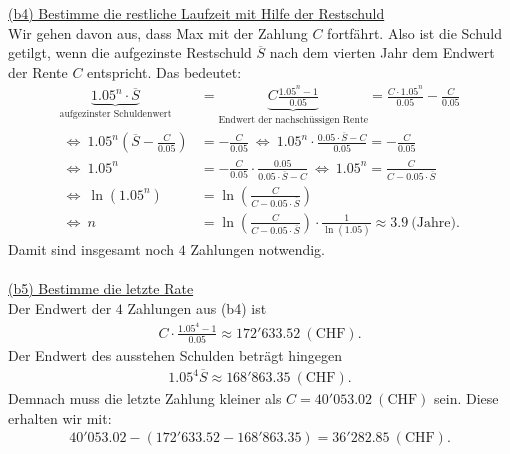 \underline{(b4) Bestimme die restliche Laufzeit mit Hilfe der Restschuld}\\
Wir gehen davon aus, dass Max mit der Zahlung $ C $ fortfährt.
Also ist die Schuld getilgt, wenn die aufgezinste Restschuld $ \overline{S} $ nach dem vierten Jahr dem Endwert der Rente $ C $ entspricht. Das bedeutet:
\begin{align*}
	\underbrace{1.05^n \cdot \overline{S}}_{\textrm{aufgezinster Schuldenwert}}
	&=
	\underbrace{C\frac{1.05^n -1}{0.05}}_{\textrm{Endwert der nachschüssigen Rente}}
	=
	\frac{C \cdot 1.05^n}{0.05} - \frac{C}{0.05}\\
	\ \Leftrightarrow \
	1.05^n \left(\overline{S} - \frac{C}{0.05}\right) &= - \frac{C}{0.05}
	\ \Leftrightarrow \
	1.05^n \cdot \frac{0.05 \cdot \overline{S} -C}{0.05}  = -\frac{C}{0.05}\\
	\ \Leftrightarrow \
	1.05^n &= -\frac{C}{0.05} \cdot \frac{0.05}{0.05 \cdot \overline{S} -C}
	 \  \Leftrightarrow \
	1.05^n =  \frac{C}{C - 0.05 \cdot \overline{S}}\\
	\ \Leftrightarrow \
	\ln(1.05^n) &= \ln\left(\frac{C}{C - 0.05 \cdot \overline{S}}\right)\\
	\ \Leftrightarrow \
	n &= \ln\left(\frac{C}{C - 0.05 \cdot \overline{S}}\right)\cdot \frac{1}{\ln(1.05)}
	\approx 3.9 \ \textrm{(Jahre)}.
\end{align*}
Damit sind insgesamt noch $ 4 $ Zahlungen notwendig.\\
\\
\underline{(b5) Bestimme die letzte Rate}\\
Der Endwert der $ 4 $ Zahlungen aus (b4) ist
\begin{align*}
	C \cdot \frac{1.05^4 -1 }{0.05}
	\approx 172'633.52 \ \mathrm{(CHF)}.
\end{align*}
Der Endwert des ausstehen Schulden beträgt hingegen
\begin{align*}
	1.05^4 \overline{S}
	\approx 
	168'863.35 \ \mathrm{(CHF)}.
\end{align*}
Demnach muss die letzte Zahlung kleiner als $ C = 40'053.02 \ \mathrm{(CHF)} $ sein.
Diese erhalten wir mit:
\begin{align*}
	40'053.02 - (172'633.52 - 168'863.35)
	=36'282.85 \ \mathrm{(CHF)}.
\end{align*}

\newpage
